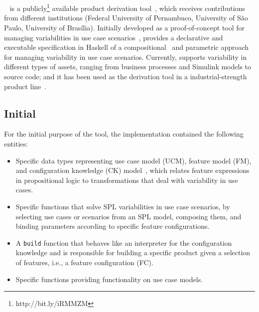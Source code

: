 
\section{\hp}
\label{sec:hephaestus}

\hp~\cite{rbonifacio:sbcars2009} is a
publicly\footnote{http://bit.ly/iRMMZM} available product derivation
tool~\cite{deelstra:2005}, which receives contributions from different
institutions (Federal University of Pernambuco, University of S\~{a}o
Paulo, University of Bras\'{i}lia).  Initially developed as a
proof-of-concept tool for managing variabilities in use case
scenarios~\cite{rbonifacio:aosd2009}, \hp{} provides a
declarative and executable specification in Haskell of a
compositional~\cite{kastner:2008} and parametric approach for managing
variability in use case scenarios.  Currently, \hp{} supports
variability in different types of assets, ranging from business
processes and Simulink models to source code; and it has been used as
the derivation tool in a industrial-strength product
line~\cite{ferreira:2010}.


\subsection{Initial \hp}
\label{S:initial-hp}

For the initial purpose of the tool, the implementation contained the
following entities:

\begin{itemize}
\item Specific data types representing use case model (UCM), feature
  model (FM), and configuration knowledge (CK) model~\cite{gpbook},
  which relates feature expressions in propositional logic to
  transformations that deal with variability in use cases.

\item Specific functions that solve SPL variabilities in use case
  scenarios, by selecting use cases or scenarios from an SPL model,
  composing them, and binding parameters according to specific feature
  configurations.

\item A \texttt{build} function that behaves like an interpreter for
  the configuration knowledge and is responsible for building a
  specific product given a selection of features, i.e., a feature
  configuration (FC).

\item Specific functions providing functionality on use case models.

\end{itemize}

